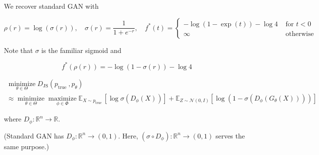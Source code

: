 \begin{concept}
    We recover standard GAN with

    $$
    \rho(r)=\log (\sigma(r)), \quad \sigma(r)=\frac{1}{1+e^{-r}}, \quad f^{*}(t)= \begin{cases}-\log (1-\exp (t))-\log 4 & \text { for } t<0 \\ \infty & \text { otherwise }\end{cases}
    $$

    Note that $\sigma$ is the familiar sigmoid and

    $$
    f^{*}(\rho(r))=-\log (1-\sigma(r))-\log 4
    $$

    $$
    \begin{gathered}
    \underset{\theta \in \Theta}{\operatorname{minimize}} D_{\mathrm{JS}}\left(p_{\text {true }}, p_{\theta}\right) \\
    \approx \underset{\theta \in \Theta}{\operatorname{minimize}} \underset{\phi \in \Phi}{\operatorname{maximize}} \mathbb{E}_{X \sim p_{\text {true }}}\left[\log \sigma\left(D_{\phi}(X)\right)\right]+\mathbb{E}_{Z \sim \mathcal{N}(0, I)}\left[\log \left(1-\sigma\left(D_{\phi}\left(G_{\theta}(X)\right)\right)\right)\right]
    \end{gathered}
    $$

    where $D_{\phi}: \mathbb{R}^{n} \rightarrow \mathbb{R}$.

    (Standard GAN has $D_{\phi}: \mathbb{R}^{n} \rightarrow(0,1)$. Here, $\left(\sigma \circ D_{\phi}\right): \mathbb{R}^{n} \rightarrow(0,1)$ serves the same purpose.)
\end{concept}

